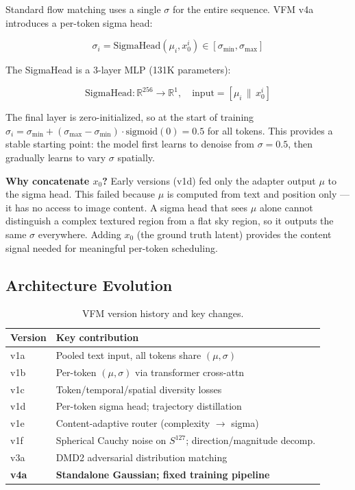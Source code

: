 \documentclass[10pt,twocolumn]{article}
\begin{document}
Standard flow matching uses a single $\sigma$ for the entire sequence. VFM v4a introduces a per-token sigma head:

\begin{equation}
  \sigma_i = \text{SigmaHead}(\mu_i, x_0^i) \in [\sigma_{\min}, \sigma_{\max}]
\end{equation}

The SigmaHead is a 3-layer MLP (131K parameters):

\begin{equation}
  \text{SigmaHead}: \mathbb{R}^{256} \to \mathbb{R}^1, \quad \text{input} = [\mu_i \,\|\, x_0^i]
\end{equation}

The final layer is zero-initialized, so at the start of training $\sigma_i = \sigma_{\min} + (\sigma_{\max}-\sigma_{\min}) \cdot \text{sigmoid}(0) = 0.5$ for all tokens. This provides a stable starting point: the model first learns to denoise from $\sigma=0.5$, then gradually learns to vary $\sigma$ spatially.

\textbf{Why concatenate $x_0$?} Early versions (v1d) fed only the adapter output $\mu$ to the sigma head. This failed because $\mu$ is computed from text and position only — it has no access to image content. A sigma head that sees $\mu$ alone cannot distinguish a complex textured region from a flat sky region, so it outputs the same $\sigma$ everywhere. Adding $x_0$ (the ground truth latent) provides the content signal needed for meaningful per-token scheduling.

\subsection{Architecture Evolution}

\begin{table}[h]
\centering
\caption{VFM version history and key changes.}
\label{tab:vfm_versions}
\begin{tabular}{@{}lp{5.2cm}@{}}
\toprule
Version & Key contribution \\
\midrule
v1a & Pooled text input, all tokens share $(\mu,\sigma)$ \\
v1b & Per-token $(\mu,\sigma)$ via transformer cross-attn \\
v1c & Token/temporal/spatial diversity losses \\
v1d & Per-token sigma head; trajectory distillation \\
v1e & Content-adaptive router (complexity $\to$ sigma) \\
v1f & Spherical Cauchy noise on $S^{127}$; direction/magnitude decomp. \\
v3a & DMD2 adversarial distribution matching \\
\textbf{v4a} & \textbf{Standalone Gaussian; fixed training pipeline} \\
\bottomrule
\end{tabular}
\end{table}
\end{document}
